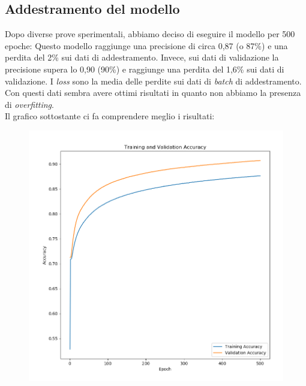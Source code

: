\subsection{Addestramento del modello}
Dopo diverse prove sperimentali, abbiamo deciso di eseguire il modello per 500 epoche:
\vspace*{2ex}
\vspace*{2ex}
Questo modello raggiunge una precisione di circa 0,87 (o 87\%) e una perdita del 2\% sui dati di addestramento. Invece, sui dati di validazione la precisione supera lo 0,90 (90\%) e raggiunge una perdita del 1,6\% sui dati di validazione. I \textit{loss} sono la media delle perdite sui dati di \textit{batch} di addestramento. Con questi dati sembra avere ottimi risultati in quanto non abbiamo la presenza di \textit{overfitting}.\\
\newline
Il grafico sottostante ci fa comprendere meglio i risultati:
\begin{figure}[H]
	\centering
	\includegraphics[scale=0.50]{./images/plot.png}
\end{figure}

